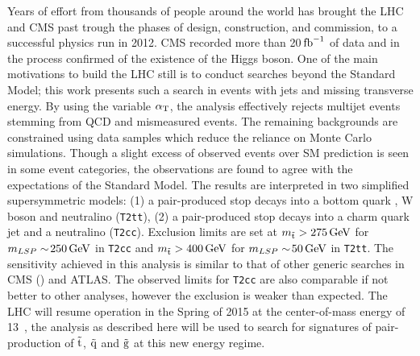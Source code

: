 Years of effort from thousands of people around the world
has brought the LHC and CMS past trough the phases of design, construction,
and commission, to a successful physics run in 2012. CMS recorded more than 
20$\mbox{\ensuremath{\,\text{fb}^\text{$-$1}}}$ of data and in the process confirmed of the existence of the Higgs boson. 
One of the main motivations to build the LHC still is to conduct
searches beyond the Standard Model; this work presents such a search
in events with jets and missing transverse energy. By using the variable $\alpha_{\text{T}}$,
the analysis effectively rejects multijet events stemming from QCD and 
mismeasured events. The remaining backgrounds are constrained using
data samples which reduce the reliance on Monte Carlo simulations. Though
a slight excess of observed events over SM prediction is seen in some event categories, 
the observations are found to agree with the expectations of the Standard Model. 
The results are interpreted in two simplified supersymmetric models: (1) a 
pair-produced stop decays into a bottom quark , W boson and neutralino 
(\texttt{T2tt}), (2) a pair-produced stop decays into a charm quark 
jet and a neutralino (\texttt{T2cc}). 
Exclusion limits are set at $m_{\tilde{\rm t}}>275\,\text{Ge\hspace{-.08em}V}$ for $m_{LSP}\sim\!250\,\text{Ge\hspace{-.08em}V}$ 
in \texttt{T2cc} and $m_{\tilde{\rm t}}>400\,\text{Ge\hspace{-.08em}V}$ for $m_{LSP}\sim\!50\,\text{Ge\hspace{-.08em}V}$ in \texttt{T2tt}. 
The sensitivity achieved in this analysis is similar to that of other 
generic searches in CMS (\cite{CMS-PAS-SUS-14-008,cms-pas-sus-09001})
and ATLAS. The observed limits for \texttt{T2cc} are also comparable 
if not better to other analyses, however the  exclusion is 
weaker than expected. The LHC will resume operation in the Spring of 
2015 at the center-of-mass energy of 13~\TeV, the \alphat 
analysis as described here will be used to search for signatures of 
pair-production of $\tilde{\rm t}$, $\tilde{\rm q}$ and $\tilde{\rm g}$ at this new energy regime.
